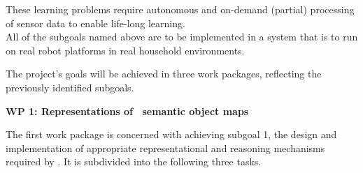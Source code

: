   These learning problems require autonomous and on-demand (partial) 
  processing of sensor data to enable life-long learning.\\

All of the subgoals named above are to be implemented in a system that
is to run on real robot platforms in real household environments.

The project's goals will be achieved in three work packages, reflecting
the previously identified subgoals.

\textbf{WP 1: Representations of \ksem\ semantic object maps}

The first work package is concerned with achieving subgoal 1, the design
and implementation of appropriate representational and reasoning
mechanisms required by \ksem. It is subdivided into the following
three tasks.

